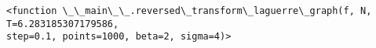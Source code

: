 \documentclass[11pt]{article}
\makeatletter
\newcommand{\boxspacing}{\kern\kvtcb@left@rule\kern\kvtcb@boxsep}
\newcommand{\prompt}[4]{
        {\ttfamily\llap{{\color{#2}[#3]:\hspace{3pt}#4}}\vspace{-\baselineskip}}
    }
\makeatother
\begin{document}
    
            \begin{tcolorbox}[breakable, size=fbox, boxrule=.5pt, pad at break*=1mm, opacityfill=0]
\prompt{Out}{outcolor}{40}{\boxspacing}
\begin{Verbatim}[commandchars=\\\{\}]
<function \_\_main\_\_.reversed\_transform\_laguerre\_graph(f, N, T=6.283185307179586,
step=0.1, points=1000, beta=2, sigma=4)>
\end{Verbatim}
\end{tcolorbox}
        
    \begin{tcolorbox}[breakable, size=fbox, boxrule=1pt, pad at break*=1mm,colback=cellbackground, colframe=cellborder]
\prompt{In}{incolor}{ }{\boxspacing}
\begin{Verbatim}[commandchars=\\\{\}]

\end{Verbatim}
\end{tcolorbox}


    
    
    
\end{document}
